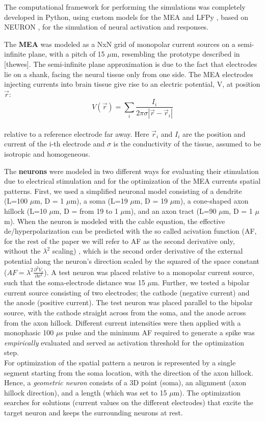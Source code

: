 \documentclass[conference]{IEEEtran}
\begin{document}
The computational framework for performing the simulations was completely
developed in Python, using custom models for the MEA and LFPy \cite{einevoll2014lfpy},
based on NEURON \cite{carnevale2006neuron}, for the simulation of
neural activation and responses. \par
The \textbf{MEA} was modeled as a NxN grid of monopolar current sources
on a semi-infinite plane, with a pitch of 15 $\mu$m, resembling
the prototype described in {[}thewes{]}. The semi-infinite plane approximation
is due to the fact that electrodes lie on a shank, facing the neural
tissue only from one side. The MEA electrodes injecting currents into brain tissue give rise to an electric potential, V,  at position $\vec{r}$:
\[
V(\vec{r})=\sum_{i}\frac{I_{i}}{2\pi\sigma\left|\vec{r}-\vec{r}_{i}\right|}
\]
\\
relative to a reference electrode far away. Here $\vec{r}_{i}$ and $I_{i}$ are the position and current of
the i-th electrode and $\sigma$ is the conductivity of the tissue,
assumed to be isotropic and homogeneous. \par
The \textbf{neurons }were modeled in two different ways for evaluating their
stimulation due to electrical stimulation and for the optimization of the MEA 
currents spatial patterns. First, we used a simplified neuronal model consisting of a dendrite
(L=100 $\mu$m, D = 1 $\mu$m), a soma (L=19 $\mu$m,
D = 19 $\mu$m), a cone-shaped axon hillock (L=10 $\mu$m,
D = from 19 to 1 $\mu$m), and an axon tract (L=90 $\mu$m,
D = 1 $\mu$m). When the neuron is modeled with the cable equation,
the effective de/hyperpolarization can be predicted with the so called
acivation function (AF, for the rest of the paper we will refer to AF as the second
derivative only, without the $\lambda^{2}$ scaling) \cite{rattay1990electrical}, which is the
second order derivative of the external potential along the neuron's
direction scaled by the squared of the space constant ($AF=\lambda^{2}\frac{\partial^{2}V_{e}}{\partial x^{2}}$).
A test neuron was placed relative to a monopolar current source, 
such that the soma-electrode distance was 15 $\mu$m. Further, 
we tested a bipolar current source consisting of two electrodes;
the cathode (negative current) and the anode (positive current). 
The test neuron was placed parallel to the bipolar source, with 
the cathode straight across from the soma, and the anode across 
from the axon hillock. Different current intensities
were then applied with a monophasic 100 $\mu$s pulse and the
minimum AF required to
generate a spike was \emph{empirically }evaluated and served as activation
threshold for the optimization step. \\
For optimization of the spatial pattern a neuron is represented by
a single segment starting from the soma location, with the direction
of the axon hillock. Hence, a \emph{geometric neuron} consists of
a 3D point (soma), an alignment (axon hillock direction), and a length
(which was set to 15 $\mu$m). The optimization searches for
solutions (current values on the different electrodes) that excite
the target neuron and keeps the surrounding neurons at rest.
\end{document}
